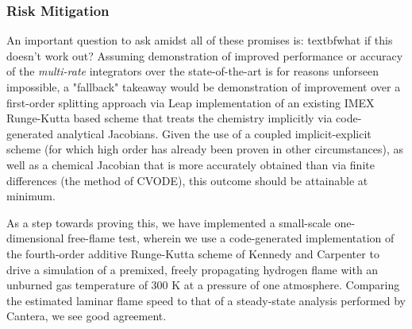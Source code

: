 \subsubsection{Risk Mitigation}

An important question to ask amidst all of these promises is: 
textbf{what if this doesn't work out?} Assuming demonstration of improved
performance or accuracy of the \emph{multi-rate} integrators over the
state-of-the-art is for reasons unforseen impossible, a "fallback" takeaway
would be demonstration of improvement over a first-order splitting
approach via Leap implementation of an existing IMEX Runge-Kutta based scheme
that treats the chemistry implicitly via code-generated analytical Jacobians.
Given the use of a coupled implicit-explicit scheme (for which high order has
already been proven in other circumstances), as well as a chemical Jacobian
that is more accurately obtained than via finite differences (the method
of CVODE), this outcome should be attainable at minimum.

As a step towards proving this, we have implemented a small-scale one-dimensional
free-flame test, wherein we use a code-generated implementation of the fourth-order
additive Runge-Kutta scheme of Kennedy and Carpenter to drive a simulation of
a premixed, freely propagating hydrogen flame with an unburned gas temperature
of 300 K at a pressure of one atmosphere. Comparing the estimated laminar
flame speed to that of a steady-state analysis performed by Cantera, we see
good agreement.

